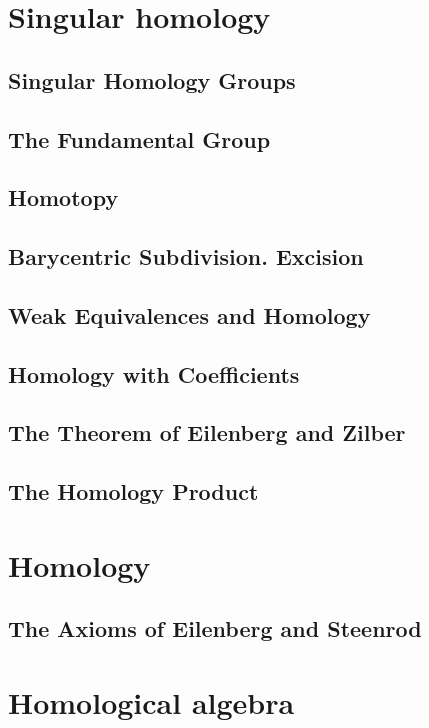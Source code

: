 \documentclass[11pt]{book} %
\begin{document}


\chapter{Singular homology}
\section{Singular Homology Groups}
\section{The Fundamental Group
}

\section{Homotopy
}
\section{Barycentric Subdivision. Excision}
\section{Weak Equivalences and Homology}
\section{Homology with Coefficients}
\section{The Theorem of Eilenberg and Zilber}
\section{The Homology Product}
\chapter{Homology}
\section{The Axioms of Eilenberg and Steenrod}


\chapter{Homological algebra}
\end{document}
